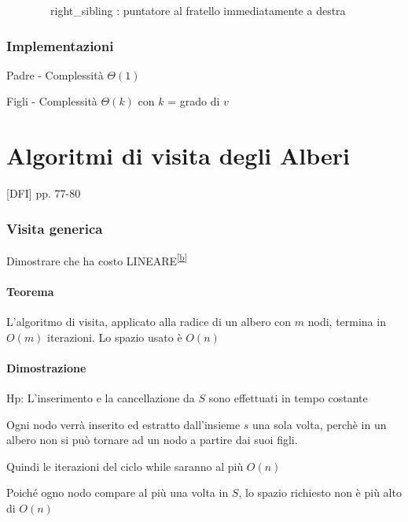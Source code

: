 \documentclass[tikz]{article}
\let\oldparagraph\paragraph
\renewcommand{\paragraph}[1]{\oldparagraph{#1}\mbox{}}
\begin{document}
{{{{~~~~~~~~right\_sibling : puntatore al fratello immediatamente a destra}

\subsubsection{Implementazioni}

{Padre - Complessità $\Theta(1)$}



{Figli - Complessità $\Theta(k)$ con $k$ = grado di $v$}



\section{Algoritmi di visita degli Alberi}

{{[}DFI{]} pp. 77-80}

\subsubsection{Visita generica}



{Dimostrare che ha costo LINEARE}\textsuperscript{\protect\hyperlink{cmnt2}{{[}b{]}}}

\paragraph{Teorema}

{L'algoritmo di visita, applicato alla radice di un albero con $m$ nodi, termina in $O(m)$ iterazioni. Lo spazio usato è $O(n)$}

\paragraph{Dimostrazione}

{Hp: L'inserimento e la cancellazione da $S$ sono effettuati in tempo costante}

{Ogni nodo verrà inserito ed estratto dall'insieme $s$ una sola volta, perchè in un albero non si può tornare ad un nodo a partire dai suoi figli.}

{Quindi le iterazioni del ciclo while saranno al più $O(n)$}

{Poiché ogno nodo compare al più una volta in $S$, lo spazio richiesto non è più alto di $O(n)$}

}}}
\end{document}
